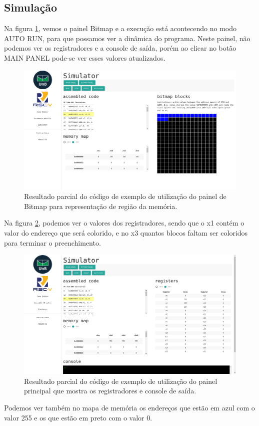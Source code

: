 \subsection{Simulação}
	
	Na figura \ref{fig:simulation-bitmap-bitmap-panel}, vemos o painel Bitmap e a execução está acontecendo no modo AUTO RUN, para que possamos ver a dinâmica do programa. Neste painel, não podemos ver os registradores e a console de saída, porém ao clicar no botão MAIN PANEL pode-se ver esses valores atualizados.

	\begin{figure}[h!]
	  \centering
	  \includegraphics[width=14cm]{img/simulation_bitmap_bitmap_panel.png}
	  \caption{Resultado parcial do código de exemplo de utilização do painel de Bitmap para representação de região da memória.}
	  \label{fig:simulation-bitmap-bitmap-panel}
	\end{figure}

	Na figura \ref{fig:simulation-bitmap-main-panel}, podemos ver o valores dos registradores, sendo que o x1 contém o valor do endereço que será colorido, e no x3 quantos blocos faltam ser coloridos para terminar o preenchimento.

	\begin{figure}[h!]
	  \centering
	  \includegraphics[width=14cm]{img/simulation_bitmap_main_panel.png}
	  \caption{Resultado parcial do código de exemplo de utilização do painel principal que mostra os registradores e console de saída.}
	  \label{fig:simulation-bitmap-main-panel}
	\end{figure}

	Podemos ver também no mapa de memória os endereços que estão em azul com o valor 255 e os que estão em preto com o valor 0.